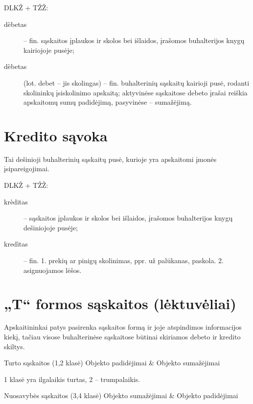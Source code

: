 DLKŽ + TŽŽ:
\begin{description}
  \item[dèbetas] – fin. sąskaitos įplaukos ir skolos bei išlaidos,
    įrašomos buhalterijos knygų kairiojoje pusėje;
  \item[dèbetas] (lot. debet – jis skolingas) – fin. buhalterinių sąskaitų
    kairioji pusė, rodanti skolininkų įsiskolinimo apskaitą; aktyvinėse
    sąskaitose debeto įrašai reiškia apskaitomų sumų padidėjimą,
    pasyvinėse – sumažėjimą.
\end{description}

\section{Kredito sąvoka}


Tai dešinioji buhalterinių sąskaitų pusė, kurioje yra apskaitomi įmonės
įsipareigojimai.

DLKŽ + TŽŽ:
\begin{description}
  \item[krèditas] – sąskaitos įplaukos ir skolos bei išlaidos, įrašomos
    buhalterijos knygų dešiniojoje pusėje;
  \item[kredìtas] – fin. 1. prekių ar pinigų skolinimas, ppr. už palūkanas,
    paskola. 2. asignuojamos lėšos.
\end{description}

\section{„T“ formos sąskaitos (lėktuvėliai)}


Apskaitininkai patys pasirenka sąskaitos formą ir joje atspindimos
informacijos kiekį, tačiau visose buhalterinėse sąskaitose būtinai
skiriamos debeto ir kredito skiltys.


\begin{PlaneTable}{Turto sąskaitos (1,2 klasė)}
  Objekto padidėjimai & Objekto sumažėjimai \\
\end{PlaneTable}

1 klasė yra ilgalaikis turtas, 2 – trumpalaikis.

\begin{PlaneTable}{Nuosavybės sąskaitos (3,4 klasė)}
  Objekto sumažėjimai & Objekto padidėjimai \\
\end{PlaneTable}

